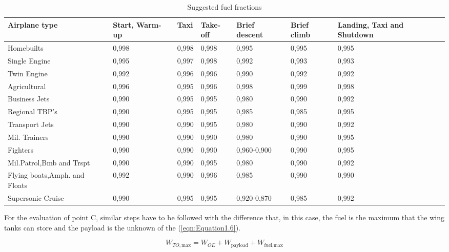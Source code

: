 \bigskip
\begin{table}[!ht]
\centering
\begin{tabular}{p{2.7cm}p{1.8cm}p{1.1cm}p{1.7cm}p{2.4cm}p{1.2cm}p{2.1cm}}
\toprule
\textbf{Airplane type} & \textbf{Start}, \textbf{Warm-up} & \textbf{Taxi} & \textbf{Take-off} & \textbf{Brief descent} & \textbf{Brief climb} & \textbf{Landing, Taxi and Shutdown} \\
\midrule
Homebuilts                     & 0,998 & 0,998 & 0,998 & 0,995 & 0,995 & 0,995       \\[0.7cm]
Single Engine                  & 0,995 & 0,997 & 0,998 & 0,992 & 0,993 & 0,993       \\[0.7cm]
Twin Engine                    & 0,992 & 0,996 & 0,996 & 0,990 & 0,992 & 0,992       \\[0.7cm]
Agricultural                   & 0,996 & 0,995 & 0,996 & 0,998 & 0,999 & 0,998       \\[0.7cm]
Business Jets                  & 0,990 & 0,995 & 0,995 & 0,980 & 0,990 & 0,992       \\[0.7cm]
Regional TBP's                 & 0,990 & 0,995 & 0,995 & 0,985 & 0,985 & 0,995       \\[0.7cm]
Transport Jets                 & 0,990 & 0,990 & 0,995 & 0,980 & 0,990 & 0,992       \\[0.7cm]
Mil. Trainers                  & 0,990 & 0,990 & 0,990 & 0,980 & 0,990 & 0,995       \\[0.7cm]
Fighters                       & 0,990 & 0,990 & 0,990 & 0,960-0,900 & 0,990 & 0,995     \\[0.7cm]
Mil.Patrol,Bmb and Trspt       & 0,990 & 0,990 & 0,995 & 0,980 & 0,990 & 0,992       \\[0.7cm]
Flying boats,Amph. and Floats  & 0,992 & 0,990 & 0,996 & 0,985 & 0,990 & 0,990       \\[1.2	cm]
Supersonic Cruise              & 0,990 & 0,995 & 0,995 & 0,920-0,870 & 0,985 & 0,992     \\[0.1	cm]
\bottomrule
\end{tabular}
\caption{Suggested fuel fractions}
\label{table:Table1}
\end{table}

\noindent
For the evaluation of point C, similar steps have to be followed with the difference that, in this case, the fuel is the maximum that the wing tanks can store and the payload is the unknown of the (\ref{eqn:Equation1.6}).

\begin{equation}
W_{TO,\text{max}}=W_{OE}+W_{\text{payload}}+W_{\text{fuel,max}}
\label{eqn:Equation1.6}
\end{equation}

